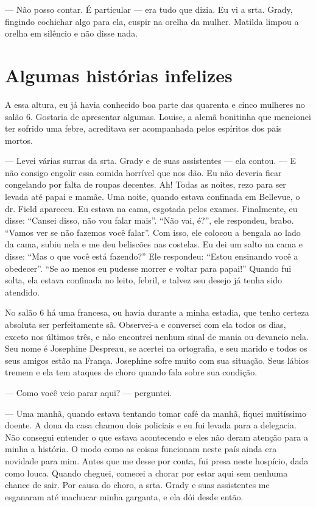 --- Não posso contar. É particular --- era tudo que dizia. Eu vi a
srta. Grady, fingindo cochichar algo para ela, cuspir na orelha da
mulher. Matilda limpou a orelha em silêncio e não disse nada.

\label{section-8}

\chapter{Algumas histórias
infelizes}\label{capuxedtulo-xiv-algumas-histuxf3rias-infelizes}

A essa altura, eu já havia conhecido boa parte das quarenta e cinco
mulheres no salão 6. Gostaria de apresentar algumas. Louise, a alemã
bonitinha que mencionei ter sofrido uma febre, acreditava ser
acompanhada pelos espíritos dos pais mortos. 

--- Levei várias surras da
srta. Grady e de suas assistentes --- ela contou. --- E não consigo
engolir essa comida horrível que nos dão. Eu não deveria ficar
congelando por falta de roupas decentes. Ah! Todas as noites, rezo para
ser levada até papai e mamãe. Uma noite, quando estava confinada em
Bellevue, o dr. Field apareceu. Eu estava na cama, esgotada pelos
exames. Finalmente, eu disse: ``Cansei disso, não vou falar mais''.
``Não vai, é?'', ele respondeu, brabo. ``Vamos ver se não fazemos você
falar''. Com isso, ele colocou a bengala ao lado da cama, subiu nela e
me deu beliscões nas costelas. Eu dei um salto na cama e disse: ``Mas o
que você está fazendo?'' Ele respondeu: ``Estou ensinando você a
obedecer''. ``Se ao menos eu pudesse morrer e voltar para papai!'' Quando
fui solta, ela estava confinada no leito, febril, e talvez seu desejo já
tenha sido atendido.

No salão 6 há uma francesa, ou havia durante a minha estadia, que tenho
certeza absoluta ser perfeitamente sã. Observei-a e conversei com ela
todos os dias, exceto nos últimos três, e não encontrei nenhum sinal de
mania ou devaneio nela. Seu nome é Josephine Despreau, se acertei na
ortografia, e seu marido e todos os seus amigos estão na França.
Josephine sofre muito com sua situação. Seus lábios tremem e ela tem
ataques de choro quando fala sobre sua condição. 

--- Como você veio parar aqui? --- perguntei.

--- Uma manhã, quando estava tentando tomar café da manhã, fiquei
muitíssimo doente. A dona da casa chamou dois policiais e eu fui levada
para a delegacia. Não consegui entender o que estava acontecendo e eles
não deram atenção para a minha a história. O modo como as coisas
funcionam neste país ainda era novidade para mim. Antes que me desse por
conta, fui presa neste hospício, dada como louca. Quando cheguei,
comecei a chorar por estar aqui sem nenhuma chance de sair. Por causa do
choro, a srta. Grady e suas assistentes me esganaram até machucar minha
garganta, e ela dói desde então.

